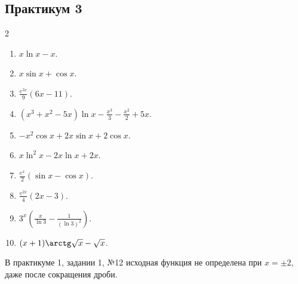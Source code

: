 \subsection*{Практикум 3}
\begin{multicols}{2}
\begin{enumerate}
\item $x\ln x-x$.
\item $x\sin x+\cos x$.
\item $\frac{e^{3x}}9(6x-11)$.
\item $(x^3+x^2-5x)\ln x-\frac{x^3}{3}-\frac{x^2}{2}+5x$.
\item $-x^2\cos x+2x\sin x+2\cos x$.
\item $x\ln^{2}x-2x\ln x+2x$.
\item $\frac{e^x}{2}(\sin x-\cos x)$.
\item $\frac{e^{2x}}4(2x-3)$.
\item $3^x\left(\frac{x}{\ln3}-\frac{1}{(\ln 3)^2}\right)$.
\item $(x+1)\arctg\sqrt{x}-\sqrt{x}$.
\end{enumerate}
\end{multicols}
В практикуме 1, задании 1, №12 исходная функция не определена при $x=\pm2$, даже после сокращения дроби.
